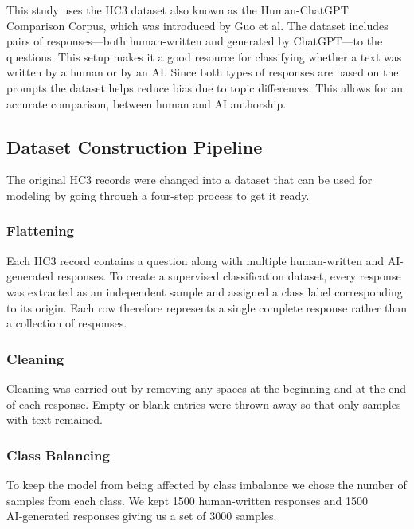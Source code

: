 \documentclass[conference]{IEEEtran}
\begin{document}
This study uses the HC3 dataset also known as the Human-ChatGPT Comparison Corpus, which was introduced by Guo et al. The dataset includes pairs of responses—both human-written and generated by ChatGPT—to the questions. This setup makes it a good resource for classifying whether a text was written by a human or by an AI. Since both types of responses are based on the prompts the dataset helps reduce bias due to topic differences. This allows for an accurate comparison, between human and AI authorship.

\subsection{\textbf{Dataset Construction Pipeline}}

The original HC3 records were changed into a dataset that can be used for modeling by going through a four-step process to get it ready.

\subsubsection{Flattening}

Each HC3 record contains a question along with multiple human-written and AI-generated responses. To create a supervised classification dataset, every response was extracted as an independent sample and assigned a class label corresponding to its origin. Each row therefore represents a single complete response rather than a collection of responses.

\subsubsection{Cleaning}
Cleaning was carried out by removing any spaces at the beginning and at the end of each response. Empty or blank entries were thrown away so that only samples with text remained.

\subsubsection{Class Balancing}

To keep the model from being affected by class imbalance we chose the number of samples from each class. We kept 1500 human‑written responses and 1500 AI‑generated responses giving us a set of 3000 samples.
\end{document}
